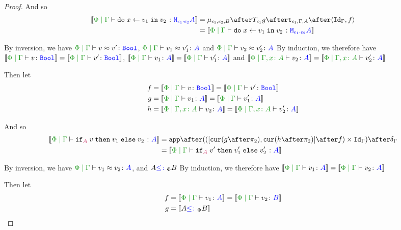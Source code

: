 \documentclass{report}
\begin{document}
\begin{framed}
\begin{proof}
        
        
        And so
        \begin{align*}
                \deno{\gpetyperelation{\doin{x}{v_1}{v_2}}{\M{\e_1\dot\e_2}{A}}} & = \bind{\e_1}{\e_2}{B} \after \T{\e_1}{g} \after \tstrength{\e_1}{\G}{A} \after \pr{\idg}{f}\\
                 & = \deno{\gpetyperelation{\doin{x}{v_1}{v_2}}{\M{\e_1\dot\e_2}{A}}}
        \end{align*}

        \case{\eqif}
        By inversion, we have $\gpeberelation{v}{v'}{\B}$, $\gpeberelation{v_1}{v_1'}{A}$ and $\gpeberelation{v_2}{v_2'}{A}$
        By induction, we therefore have $\deno{\gpetyperelation{v}{\B}} = \deno{\gpetyperelation{v'}{\B}}$, $\deno{\gpetyperelation{v_1}{A}}= \deno{\gpetyperelation{v_1'}{A}}$ and $\deno{\etyperelation{\P}{\gax}{v_2}{A}} = \deno{\etyperelation{\P}{\gax}{v_2'}{A}}$
        
        Then let
        \begin{align*}
            f &{}=\deno{\gpetyperelation{v}{\B}} = \deno{\gpetyperelation{v'}{\B}}\\
            g &{}=\deno{\gpetyperelation{v_1}{A}}= \deno{\gpetyperelation{v_1'}{A}}\\
            h &{}=\deno{\etyperelation{\P}{\gax}{v_2}{A}} = \deno{\etyperelation{\P}{\gax}{v_2'}{A}}
        \end{align*}
        
        
        
        And so
        \begin{align*}
                \deno{\gpetyperelation{\pifthenelse{A}{v}{v_1}{v_2}}{A}} & = \ifMorph{f}{g}{h}\\
                 & = \deno{\gpetyperelation{\pifthenelse{A}{v'}{v_1'}{v_2'}}{A}}
        \end{align*}

        \case{\eqsubtype}
        By inversion, we have $\gpeberelation{v_1}{v_2}{A}$, and $A {\color{blue} \leq\colon}_\Phi B$ 
        By induction, we therefore have $\deno{\gpetyperelation{v_1}{A}} = \deno{\gpetyperelation{v_2}{A}}$
        
        Then let
        \begin{align*}
            f &{}=\deno{\gpetyperelation{v_1}{A}} = \deno{\gpetyperelation{v_2}{B}}\\
            g &{}=\deno{A \subtypep B}
        \end{align*}
        

\end{proof}
\end{framed}
\end{document}
